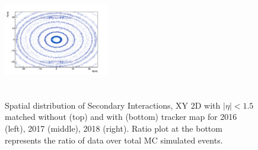 \documentclass{cernatlasnote}
\begin{document}
\begin{figure}[htp]
 \includegraphics[width=4.6cm, height=4.4cm]{images/emu_channel/2018/18_2D_plots/SecInt_XY_tracker_match_eta.png}\\
 \caption{Spatial distribution of Secondary Interactions, XY 2D with $|\eta| < 1.5$ matched without (top) and with (bottom) tracker map for 2016 (left), 2017 (middle), 2018 (right). Ratio plot at the bottom represents the ratio of data over total MC simulated events.}
 \label{fig:L0DATAMC}
  \end{figure}
\end{document}
